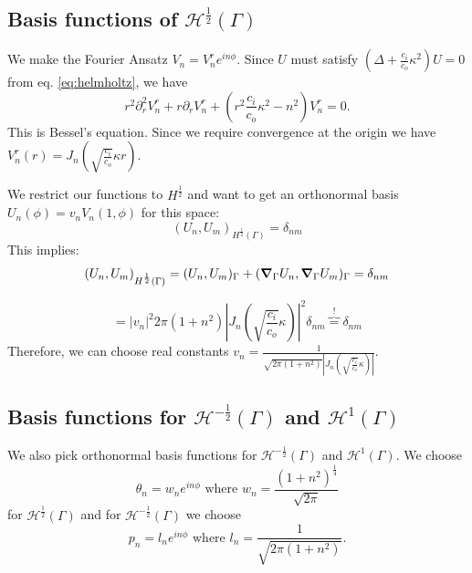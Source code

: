 \documentclass[10pt,journal,compsoc, onecolumn]{IEEEtran}
\begin{document}
\subsection{Basis functions of $\mathcal{H}^{\frac{1}{2}}(\Gamma)$}
We make the Fourier Ansatz $V_n = V^r_n e^{i n \phi}$. 
Since $U$ must satisfy  $(\Delta + \frac{c_i}{c_o}\kappa^2) U = 0$ from eq. \ref{eq:helmholtz}, 
we have 
$$
r^2 \partial_r^2V_n^r + r \partial_r V_n^r + (r^2  \frac{c_i}{c_o}\kappa^2 - n^2)V^r_n = 0.
$$
This is Bessel's equation. Since we require convergence at the origin we have $V^r_n(r) = J_n(\sqrt{ \frac{c_i}{c_o}}\kappa r)$.


We restrict our functions to $H^{\frac{1}{2}}$ and want to get an orthonormal basis $U_n(\phi) = v_n V_n(1, \phi)$ for this space: 
$$
(U_n, U_m)_{H^{\frac{1}{2}}(\Gamma)} = \delta_{nm}
$$
This implies: 
$$
(U_n, U_m)_{H^{\frac{1}{2}}(\Gamma)} = (U_n, U_m)_{\Gamma} + (\grad_\Gamma U_n, \grad_\Gamma U_m)_{\Gamma} = \delta_{nm}
$$

$$
 = |v_n|^2 2\pi(1 + n^2) |J_n(\sqrt{ \frac{c_i}{c_o}} \kappa )|^2   \delta_{nm}  \overbrace{=}^! \delta_{nm}
$$
Therefore, we can choose real constants $v_n = \frac{1}{\sqrt{2 \pi (1 + n^2)} |J_n(\sqrt{ \frac{c_i}{c_o}} \kappa  )|}$.

\subsection{Basis functions for $\mathcal{H}^{-\frac{1}{2}}(\Gamma)$ and $\mathcal{H}^1(\Gamma)$}
We also pick orthonormal basis functions for $\mathcal{H}^{-\frac{1}{2}}(\Gamma)$ and $\mathcal{H}^1(\Gamma)$.
We choose $$\theta_n =w_n e^{i n \phi}\text{ where } w_n = \frac{(1 + n^2)^{\frac{1}{4}}}{\sqrt{2 \pi}}$$ for $\mathcal{H}^{\frac{1}{2}}(\Gamma)$ and for $\mathcal{H}^{-\frac{1}{2}}(\Gamma)$ we choose  $$p_n = l_n e^{i n \phi} \text{ where } l_n = \frac{1}{\sqrt{2 \pi (1+n^2)}}. $$
\end{document}
